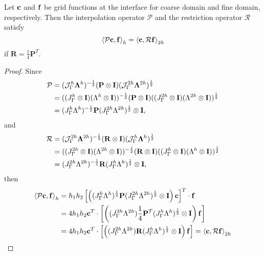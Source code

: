 {\color{red}
\begin{lemma}\label{lemma1}
 Let ${\bf c}$ and ${\bf f}$ be grid functions at the interface for coarse domain and fine domain, respectively. Then the interpolation operator $\mathcal{P}$ and the restriction operator $\mathcal{R}$ satisfy
 \begin{equation}\label{pr_relation}
 \left<\mathcal{P} {\bf c}, {\bf f}\right>_h = \left<{\bf c}, \mathcal{R}{\bf f}\right>_{2h}
 \end{equation}
 if $\bm{R} = \frac{1}{4}\bm{P}^T$. 
\end{lemma}
\begin{proof}
	Since 
	\begin{align*}
	{\mathcal{P}} &= (\mathcal{J}^h_\Gamma \bm{\Lambda}^h)^{-\frac{1}{2}}({\bf P}\otimes{\bf I})(\mathcal{J}^{2h}_\Gamma \bm{\Lambda}^{2h})^{\frac{1}{2}}\\
	& = ((J_{\Gamma}^h\otimes{\bf I})(\Lambda^h\otimes{\bf I}))^{-\frac{1}{2}}({\bf P}\otimes{\bf I})((J_{\Gamma}^{2h}\otimes{\bf I})(\Lambda^{2h}\otimes{\bf I}))^{\frac{1}{2}}\\
	& = (J_{\Gamma}^h\Lambda^h)^{-\frac{1}{2}}{\bf P}(J_{\Gamma}^{2h}\Lambda^{2h})^{\frac{1}{2}}\otimes{\bf I},
	\end{align*}
	and
	\begin{align*}
	{\mathcal{R}} &= (\mathcal{J}^{2h}_\Gamma \bm{\Lambda}^{2h})^{-\frac{1}{2}}({\bf R}\otimes{\bf I})(\mathcal{J}^{h}_\Gamma \bm{\Lambda}^{h})^{\frac{1}{2}}\\
	& = ((J_{\Gamma}^{2h}\otimes{\bf I})(\Lambda^{2h}\otimes{\bf I}))^{-\frac{1}{2}}({\bf R}\otimes{\bf I})((J_{\Gamma}^{h}\otimes{\bf I})(\Lambda^{h}\otimes{\bf I}))^{\frac{1}{2}}\\
	& = (J_{\Gamma}^{2h}\Lambda^{2h})^{-\frac{1}{2}}{\bf R}(J_{\Gamma}^{h}\Lambda^{h})^{\frac{1}{2}}\otimes{\bf I},
	\end{align*}
	then
	\begin{align*}
	\left<\mathcal{P}{\bf c}, {\bf f}\right>_h &= h_1h_2\left[\left((J_{\Gamma}^h\Lambda^h)^{\frac{1}{2}} {\bf P}(J_{\Gamma}^{2h}\Lambda^{2h})^{\frac{1}{2}}\otimes {\bf I}\right){\bf c}\right]^T\cdot{\bf f}\\
	& = 4h_1h_2 {\bf c}^T \cdot \left[\left((J_{\Gamma}^{2h}\Lambda^{2h})\frac{1}{4}{\bf P}^T(J_{\Gamma}^h\Lambda^h)^{\frac{1}{2}}\otimes {\bf I}\right) {\bf f}\right]\\
	& =4h_1h_2 {\bf c}^T \cdot \left[\left((J_{\Gamma}^{2h}\Lambda^{2h}){\bf R}(J_{\Gamma}^h\Lambda^h)^{\frac{1}{2}}\otimes {\bf I}\right) {\bf f}\right] = \left<{\bf c}, \mathcal{R}{\bf f}\right>_{2h}
	\end{align*}
\end{proof}
}

